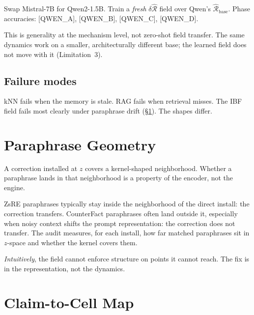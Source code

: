 \documentclass[11pt,twocolumn]{article}
\newcommand{\Cohbase}{\widehat{\mathcal{R}}_{\mathrm{base}}}
\newcommand{\dCoh}{\delta\widehat{\mathcal{R}}}
\newcommand{\PH}[1]{[\textsc{#1}]}
\theoremstyle{plain}
\begin{document}
Swap Mistral-7B for Qwen2-1.5B. Train a \emph{fresh} $\dCoh$ field over Qwen's $\Cohbase$. Phase accuracies: \PH{QWEN\_A}, \PH{QWEN\_B}, \PH{QWEN\_C}, \PH{QWEN\_D}.

This is generality at the mechanism level, not zero-shot field transfer. The same dynamics work on a smaller, architecturally different base; the learned field does not move with it (Limitation~3).

\subsection{Failure modes}

kNN fails when the memory is stale. RAG fails when retrieval misses. The IBF field fails most clearly under paraphrase drift (\S\ref{sec:paraphrase}). The shapes differ.

\section{Paraphrase Geometry}
\label{sec:paraphrase}

A correction installed at $z$ covers a kernel-shaped neighborhood. Whether a paraphrase lands in that neighborhood is a property of the encoder, not the engine.

ZsRE paraphrases typically stay inside the neighborhood of the direct install: the correction transfers. CounterFact paraphrases often land outside it, especially when noisy context shifts the prompt representation: the correction does not transfer. The audit measures, for each install, how far matched paraphrases sit in $z$-space and whether the kernel covers them.

\emph{Intuitively}, the field cannot enforce structure on points it cannot reach. The fix is in the representation, not the dynamics.

\section{Claim-to-Cell Map}
\label{sec:claim-map}
\end{document}
